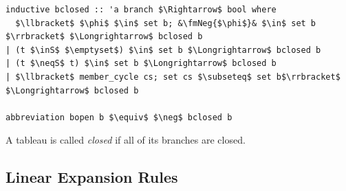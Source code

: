 \documentclass[runningheads]{llncs}
\newcommand{\inS}{\in_\text{s}}
\newcommand{\neqS}{\neq_\text{s}}
\newcommand{\fmNegSymbol}{\boldsymbol{\neg}}
\newcommand{\fmNeg}[1]{$\fmNegSymbol\:$#1}
\begin{document}
\begin{lstlisting}
inductive bclosed :: 'a branch $\Rightarrow$ bool where
  $\llbracket$ $\phi$ $\in$ set b; &\fmNeg{$\phi$}& $\in$ set b $\rrbracket$ $\Longrightarrow$ bclosed b
| (t $\inS$ $\emptyset$) $\in$ set b $\Longrightarrow$ bclosed b
| (t $\neqS$ t) $\in$ set b $\Longrightarrow$ bclosed b
| $\llbracket$ member_cycle cs; set cs $\subseteq$ set b$\rrbracket$ $\Longrightarrow$ bclosed b

abbreviation bopen b $\equiv$ $\neg$ bclosed b
\end{lstlisting}
A tableau is called \textit{closed} if all of its branches are closed.

\subsection{Linear Expansion Rules}
\end{document}
